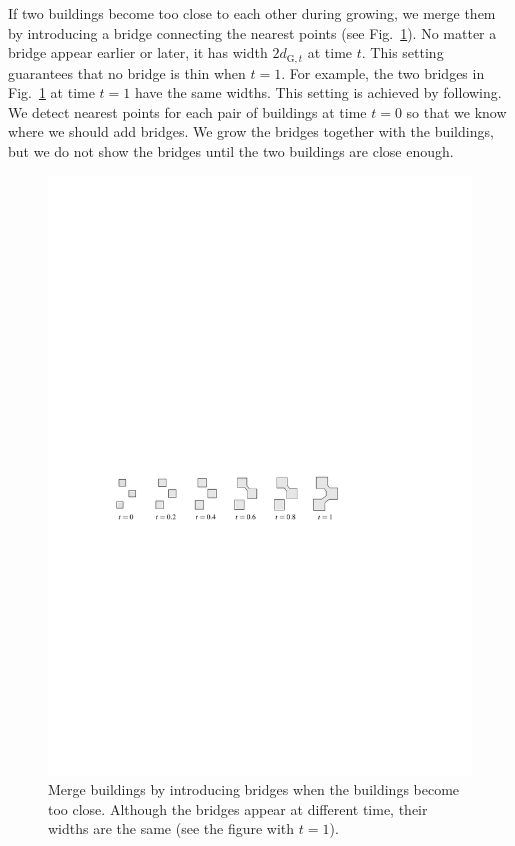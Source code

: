 \documentclass[graybox]{svmult}
\newcommand{\fig}{Fig.~}
\newcommand{\dtrm}[1]{d_{\mathrm{#1},t}}
\begin{document}
If two buildings become too close to each other during growing, 
we merge them by introducing a bridge connecting the nearest points 
(see \fig\ref{fig:GrowAndBridge}).
No matter a bridge appear earlier or later, 
it has width $2\dtrm{G}$ at time $t$.
This setting guarantees that no bridge is thin when $t=1$.
For example, the two bridges in \fig\ref{fig:GrowAndBridge} at time $t=1$ have 
the same widths.
This setting is achieved by following.
We detect nearest points for each pair of buildings at time $t=0$ so that 
we know where we should add bridges. 
We grow the bridges together with the buildings,
but we do not show the bridges until the two buildings are close enough. 


\begin{figure}[tb]
	\centering
	\includegraphics{GrowAndBridge}
	\caption{Merge buildings by introducing bridges when the buildings become 
	too close.
		Although the bridges appear at different time, 
		their widths are the same (see the figure with $t=1$).}
	\label{fig:GrowAndBridge}
\end{figure}
\end{document}
